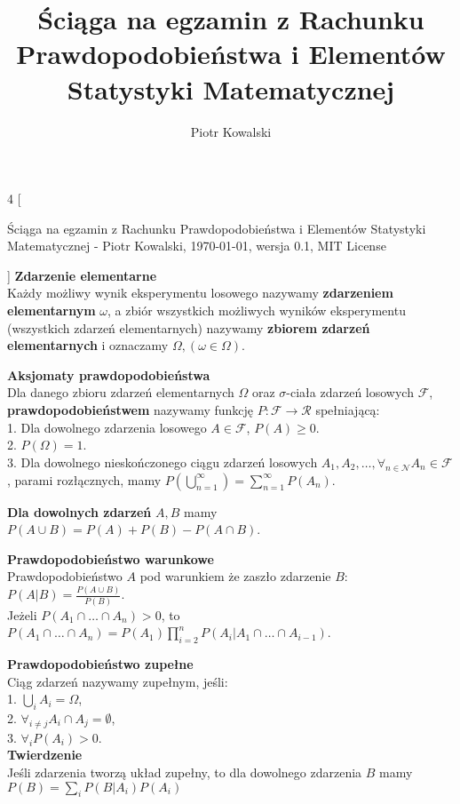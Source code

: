 \documentclass[10pt,landscape,a4paper,notitlepage]{article}
\author{Piotr Kowalski}
\title{Ściąga na egzamin z Rachunku Prawdopodobieństwa i Elementów Statystyki Matematycznej}
\begin{document}
    \begin{multicols*}{4}
        [
        \begin{center}
            \MaleMale \FemaleFemale Ściąga na egzamin z Rachunku Prawdopodobieństwa i Elementów Statystyki Matematycznej - \textcopyright Piotr Kowalski, \today , wersja 0.1, MIT License \FemaleFemale \MaleMale
        \end{center}
        ]
        \noindent\textbf{\large Zdarzenie elementarne}\\
        Każdy możliwy wynik eksperymentu losowego nazywamy \textbf{zdarzeniem elementarnym} $\omega$, a zbiór wszystkich możliwych wyników eksperymentu (wszystkich zdarzeń elementarnych) nazywamy \textbf{zbiorem zdarzeń elementarnych} i oznaczamy $\Omega, (\omega\in\Omega)$.
        
        \noindent\textbf{\large Aksjomaty prawdopodobieństwa}\\
        Dla danego zbioru zdarzeń elementarnych $\Omega$ oraz $\sigma$-ciała zdarzeń losowych $\mathcal{F}$, \textbf{prawdopodobieństwem} nazywamy funkcję $P:\mathcal{F}\rightarrow \mathcal{R}$ spełniającą:\\
        1. Dla dowolnego zdarzenia losowego $A\in\mathcal{F}$, $P(A)\geq 0$.\\
        2. $P(\Omega)=1$.\\
        3. Dla dowolnego nieskończonego ciągu zdarzeń losowych $A_1, A_2, \ldots, \forall_{n\in\mathcal{N}} A_n\in\mathcal{F}$, parami rozłącznych, mamy $P\left(\bigcup^\infty_{n=1}\right)=\sum^\infty_{n=1}P(A_n)$.

        \noindent \textbf{Dla dowolnych zdarzeń} $A, B$ mamy\\ $P(A\cup B)=P(A)+P(B)-P(A\cap B)$.

        \noindent \textbf{\large Prawdopodobieństwo warunkowe}\\
        Prawdopodobieństwo $A$ pod warunkiem że zaszło zdarzenie $B$: $P(A|B)=\frac{P(A\cup B)}{P(B)}$.\\
        Jeżeli $P(A_1\cap \ldots \cap A_n)>0$, to $P(A_1\cap \ldots \cap A_n) = P(A_1)\prod_{i=2}^nP(A_i|A_1 \cap\ldots\cap A_{i-1})$.

        \noindent \textbf{\large Prawdopodobieństwo zupełne}\\
        Ciąg zdarzeń nazywamy zupełnym, jeśli:\\
        1. $\bigcup_i A_i = \Omega$,\\
        2. $\forall_{i\neq j}A_i \cap A_j = \emptyset$,\\
        3. $\forall_i P(A_i)>0$.\\
        \textbf{Twierdzenie}\\
        Jeśli zdarzenia tworzą układ zupełny, to dla dowolnego zdarzenia $B$ mamy $P(B)=\sum_iP(B|A_i)P(A_i)$


\end{multicols*}
\end{document}
